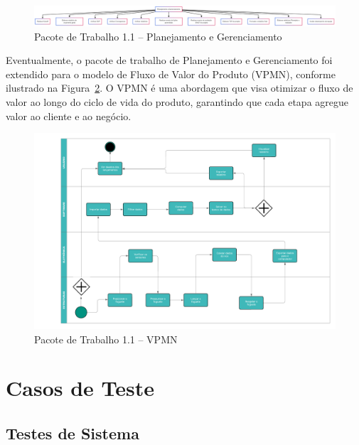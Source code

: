 \begin{figure}[!h]
	\centering
\includegraphics[width=15cm]{figuras/eap_planejamento.png}
	\caption{Pacote de Trabalho 1.1 – Planejamento e Gerenciamento}
	\label{fig_eap_planejamento} 
\end{figure}

\newpage

Eventualmente, o pacote de trabalho de Planejamento e Gerenciamento foi extendido para o modelo de Fluxo de Valor do Produto (VPMN), conforme ilustrado na Figura~\ref{fig_vpmn}. O VPMN é uma abordagem que visa otimizar o fluxo de valor ao longo do ciclo de vida do produto, garantindo que cada etapa agregue valor ao cliente e ao negócio.

\begin{figure}[!h]
	\centering
\includegraphics[width=15cm]{figuras/vpmn.png}
	\caption{Pacote de Trabalho 1.1 – VPMN}
	\label{fig_vpmn} 
\end{figure}



\section{Casos de Teste}

\subsection*{Testes de Sistema}


